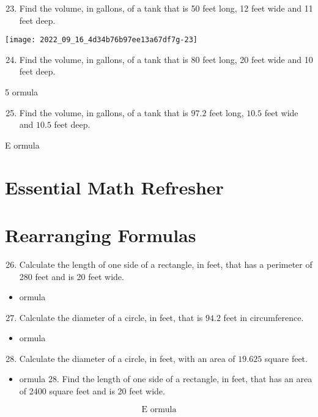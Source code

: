 \begin{enumerate}
\begin{enumerate}
  \setcounter{enumi}{22}
  \item Find the volume, in gallons, of a tank that is 50 feet long, 12 feet wide and 11 feet deep.
\end{enumerate}
\texttt{[image: 2022\_09\_16\_4d34b76b97ee13a67df7g-23]}

\begin{enumerate}
  \setcounter{enumi}{23}
  \item Find the volume, in gallons, of a tank that is 80 feet long, 20 feet wide and 10 feet deep.
\end{enumerate}
5 ormula

\begin{enumerate}
  \setcounter{enumi}{24}
  \item Find the volume, in gallons, of a tank that is $97.2$ feet long, $10.5$ feet wide and $10.5$ feet deep.
\end{enumerate}
E ormula

\section{Essential Math Refresher}
\section{Rearranging Formulas}
\begin{enumerate}
  \setcounter{enumi}{25}
  \item Calculate the length of one side of a rectangle, in feet, that has a perimeter of 280 feet and is 20 feet wide.
\end{enumerate}
\begin{itemize}
  \item ormula
\end{itemize}
\begin{enumerate}
  \setcounter{enumi}{26}
  \item Calculate the diameter of a circle, in feet, that is $94.2$ feet in circumference.
\end{enumerate}
\begin{itemize}
  \item ormula
\end{itemize}
\begin{enumerate}
  \setcounter{enumi}{27}
  \item Calculate the diameter of a circle, in feet, with an area of $19.625$ square feet.
\end{enumerate}
\begin{itemize}
  \item ormula 28. Find the length of one side of a rectangle, in feet, that has an area of 2400 square feet and is 20 feet wide.
\end{itemize}
$$
\text { E ormula }
$$


\end{enumerate}
